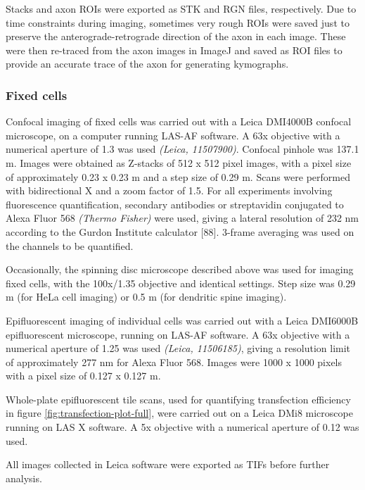 \documentclass[
  12pt,
  a4paper,
]{book}
\begin{document}
Stacks and axon ROIs were exported as STK and RGN files, respectively. Due to time constraints during imaging, sometimes very rough ROIs were saved just to preserve the anterograde-retrograde direction of the axon in each image. These were then re-traced from the axon images in ImageJ and saved as ROI files to provide an accurate trace of the axon for generating kymographs.

\subsubsection{Fixed cells}\label{fixed-cells}

Confocal imaging of fixed cells was carried out with a Leica DMI4000B confocal microscope, on a computer running LAS-AF software. A 63x objective with a numerical aperture of 1.3 was used \emph{(Leica, 11507900)}. Confocal pinhole was 137.1 \textmu{}m. Images were obtained as Z-stacks of 512 x 512 pixel images, with a pixel size of approximately 0.23 x 0.23 \textmu{}m and a step size of 0.29 \textmu{}m. Scans were performed with bidirectional X and a zoom factor of 1.5. For all experiments involving fluorescence quantification, secondary antibodies or streptavidin conjugated to Alexa Fluor 568 \emph{(Thermo Fisher)} were used, giving a lateral resolution of 232 nm according to the Gurdon Institute calculator {[}88{]}. 3-frame averaging was used on the channels to be quantified.

Occasionally, the spinning disc microscope described above was used for imaging fixed cells, with the 100x/1.35 objective and identical settings. Step size was 0.29 \textmu{}m (for HeLa cell imaging) or 0.5 \textmu{}m (for dendritic spine imaging).

Epifluorescent imaging of individual cells was carried out with a Leica DMI6000B epifluorescent microscope, running on LAS-AF software. A 63x objective with a numerical aperture of 1.25 was used \emph{(Leica, 11506185)}, giving a resolution limit of approximately 277 nm for Alexa Fluor 568. Images were 1000 x 1000 pixels with a pixel size of 0.127 x 0.127 \textmu{}m.

Whole-plate epifluorescent tile scans, used for quantifying transfection efficiency in figure \ref{fig:transfection-plot-full}, were carried out on a Leica DMi8 microscope running on LAS X software. A 5x objective with a numerical aperture of 0.12 was used.

All images collected in Leica software were exported as TIFs before further analysis.
\end{document}
